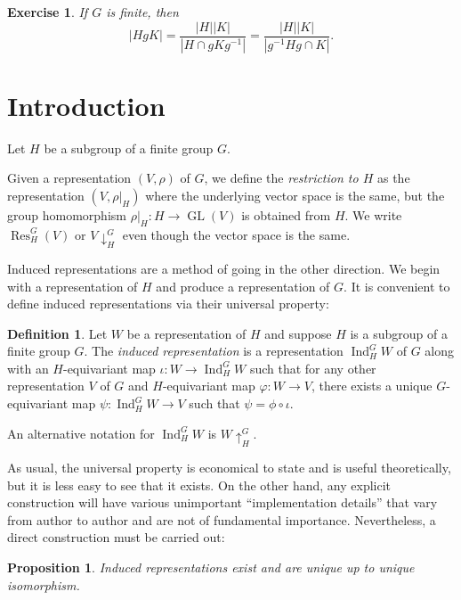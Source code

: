 \documentclass[12pt]{article}
\theoremstyle{plain}
\newtheorem{proposition}[theorem]{Proposition}
\newtheorem{exercise}[theorem]{Exercise}
\theoremstyle{definition}
\newtheorem{definition}[theorem]{Definition}
\theoremstyle{remark}
\numberwithin{equation}{section}
\begin{document}
\begin{exercise}
If $G$ is finite, then
\[
|HgK| = \frac{|H| |K|}{|H \cap g K g^{-1}|}=
\frac{|H| |K|}{|g^{-1}Hg \cap K|}.
\]
\end{exercise}

\section{Introduction}

Let $H$ be a subgroup of a finite group $G$.

Given a representation $(V,\rho)$ of $G$, we define the \emph{restriction to
$H$} as the representation $(V,\rho|_H)$ where the underlying vector
space is the same, but the group homomorphism $\rho|_H : H \to
\operatorname{GL}(V)$ is obtained from $H$.
We write $\operatorname{Res}_H^G(V)$ or $V {\downarrow}^G_H$
even though the vector space is the same.

Induced representations are a method of going in the other direction.
We begin with a representation of $H$ and produce a representation of
$G$.
It is convenient to define induced representations via their universal
property:

\begin{definition}
Let $W$ be a representation of $H$ and suppose $H$ is a subgroup of a
finite group $G$.
The \emph{induced representation} is a representation
$\operatorname{Ind}_H^G W$ of $G$ along with an
$H$-equivariant map $\iota : W \to \operatorname{Ind}_H^G W$ such that
for any other representation $V$ of $G$ and $H$-equivariant map
$\varphi : W \to V$, there exists a unique $G$-equivariant map
$\psi: \operatorname{Ind}_H^G W \to V$ such that
$\psi = \phi \circ \iota$.
\end{definition}

An alternative notation for $\operatorname{Ind}_H^G W$ is $W
{\uparrow}_H^G$.

As usual, the universal property is economical to state and is useful
theoretically, but it is less easy to see that it exists.
On the other hand, any explicit construction will have various
unimportant ``implementation details'' that vary from author to author
and are not of fundamental importance.
Nevertheless, a direct construction must be carried out:

\begin{proposition} \label{prop:ind_construction}
Induced representations exist and are unique up to unique isomorphism.
\end{proposition}
\end{document}
